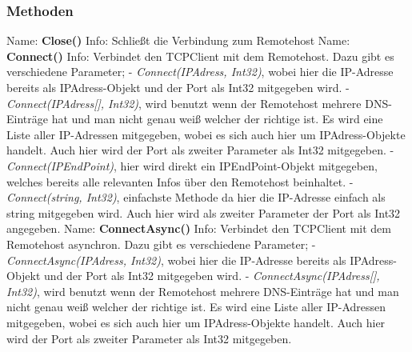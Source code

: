 \subsubsection{Methoden}
Name: \textbf{Close()}
\newline
Info: Schließt die Verbindung zum Remotehost
\newline
\newline
Name: \textbf{Connect()}
\newline
Info: Verbindet den TCPClient mit dem Remotehost. Dazu gibt es verschiedene Parameter; 
\newline \tab \newline
- \textit{Connect(IPAdress, Int32)}, wobei hier die IP-Adresse bereits als IPAdress-Objekt und der Port als Int32 mitgegeben wird.
\newline \tab \newline
- \textit{Connect(IPAdress[], Int32)}, wird benutzt wenn der Remotehost mehrere DNS-Einträge hat und man nicht genau weiß welcher der richtige ist. Es wird eine Liste aller IP-Adressen mitgegeben, wobei es sich auch hier um IPAdress-Objekte handelt. Auch hier wird der Port als zweiter Parameter als Int32 mitgegeben.
\newline \tab \newline
- \textit{Connect(IPEndPoint)}, hier wird direkt ein IPEndPoint-Objekt mitgegeben, welches bereits alle relevanten Infos über den Remotehost beinhaltet.
\newline \tab \newline
- \textit{Connect(string, Int32)}, einfachste Methode da hier die IP-Adresse einfach als string mitgegeben wird. Auch hier wird als zweiter Parameter der Port als Int32 angegeben.
\newline
\newline
Name: \textbf{ConnectAsync()}
Info: Verbindet den TCPClient mit dem Remotehost asynchron. Dazu gibt es verschiedene Parameter; 
\newline \tab \newline
- \textit{ConnectAsync(IPAdress, Int32)}, wobei hier die IP-Adresse bereits als IPAdress-Objekt und der Port als Int32 mitgegeben wird.
\newline \tab \newline
- \textit{ConnectAsync(IPAdress[], Int32)}, wird benutzt wenn der Remotehost mehrere DNS-Einträge hat und man nicht genau weiß welcher der richtige ist. Es wird eine Liste aller IP-Adressen mitgegeben, wobei es sich auch hier um IPAdress-Objekte handelt. Auch hier wird der Port als zweiter Parameter als Int32 mitgegeben.
